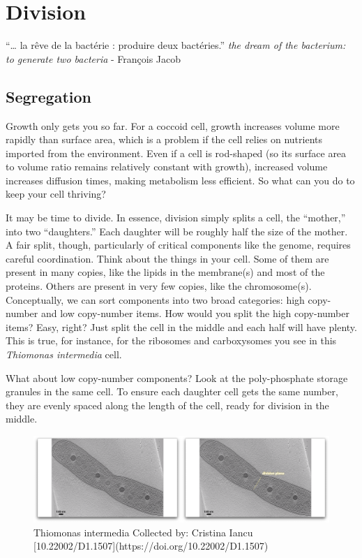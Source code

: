 \documentclass[]{tufte-book}
\begin{document}
\citet{barry2011} \citet{hoppert1999} \citet{kerfeld2018}
\citet{oostergetel2010}

\chapter{Division}\label{division}

``\ldots{} la rêve de la bactérie : produire deux bactéries.'' \emph{the
dream of the bacterium: to generate two bacteria} - François Jacob
\citet{jacob2002a}

\section{Segregation}\label{segregation}

Growth only gets you so far. For a coccoid cell, growth increases volume
more rapidly than surface area, which is a problem if the cell relies on
nutrients imported from the environment. Even if a cell is rod-shaped
(so its surface area to volume ratio remains relatively constant with
growth), increased volume increases diffusion times, making metabolism
less efficient. So what can you do to keep your cell thriving?

It may be time to divide. In essence, division simply splits a cell, the
``mother,'' into two ``daughters.'' Each daughter will be roughly half
the size of the mother. A fair split, though, particularly of critical
components like the genome, requires careful coordination. Think about
the things in your cell. Some of them are present in many copies, like
the lipids in the membrane(s) and most of the proteins. Others are
present in very few copies, like the chromosome(s). Conceptually, we can
sort components into two broad categories: high copy-number and low
copy-number items. How would you split the high copy-number items? Easy,
right? Just split the cell in the middle and each half will have plenty.
This is true, for instance, for the ribosomes and carboxysomes you see
in this \emph{Thiomonas intermedia} cell.

What about low copy-number components? Look at the poly-phosphate
storage granules in the same cell. To ensure each daughter cell gets the
same number, they are evenly spaced along the length of the cell, ready
for division in the middle.

\begin{figure}
\includegraphics{movie_stills/5_1} \caption[Thiomonas intermedia Collected by]{Thiomonas intermedia Collected by: Cristina Iancu [10.22002/D1.1507](https://doi.org/10.22002/D1.1507)}\label{fig:unnamed-chunk-80}
\end{figure}
\end{document}
